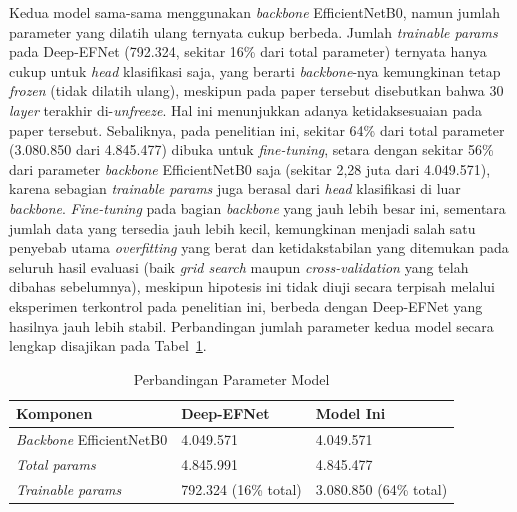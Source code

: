 Kedua model sama-sama menggunakan \textit{backbone} EfficientNetB0, namun jumlah parameter yang dilatih ulang ternyata cukup berbeda. Jumlah \textit{trainable params} pada Deep-EFNet (792.324, sekitar 16\% dari total parameter) ternyata hanya cukup untuk \textit{head} klasifikasi saja, yang berarti \textit{backbone}-nya kemungkinan tetap \textit{frozen} (tidak dilatih ulang), meskipun pada paper tersebut disebutkan bahwa 30 \textit{layer} terakhir di-\textit{unfreeze}. Hal ini menunjukkan adanya ketidaksesuaian pada paper tersebut. Sebaliknya, pada penelitian ini, sekitar 64\% dari total parameter (3.080.850 dari 4.845.477) dibuka untuk \textit{fine-tuning}, setara dengan sekitar 56\% dari parameter \textit{backbone} EfficientNetB0 saja (sekitar 2,28 juta dari 4.049.571), karena sebagian \textit{trainable params} juga berasal dari \textit{head} klasifikasi di luar \textit{backbone}. \textit{Fine-tuning} pada bagian \textit{backbone} yang jauh lebih besar ini, sementara jumlah data yang tersedia jauh lebih kecil, kemungkinan menjadi salah satu penyebab utama \textit{overfitting} yang berat dan ketidakstabilan yang ditemukan pada seluruh hasil evaluasi (baik \textit{grid search} maupun \textit{cross-validation} yang telah dibahas sebelumnya), meskipun hipotesis ini tidak diuji secara terpisah melalui eksperimen terkontrol pada penelitian ini, berbeda dengan Deep-EFNet yang hasilnya jauh lebih stabil. Perbandingan jumlah parameter kedua model secara lengkap disajikan pada Tabel~\ref{tab:param_compare}.

\begin{table}[H]
	\centering
	\caption{Perbandingan Parameter Model}
	\label{tab:param_compare}
	\begin{tabular}{|l|l|l|}
		\hline
		\textbf{Komponen} & \textbf{Deep-EFNet} & \textbf{Model Ini} \\ \hline
		\textit{Backbone} EfficientNetB0 & 4.049.571 & 4.049.571 \\ \hline
		\textit{Total params} & 4.845.991 & 4.845.477 \\ \hline
		\textit{Trainable params} & 792.324 (16\% total) & 3.080.850 (64\% total) \\ \hline
	\end{tabular}
\end{table}

